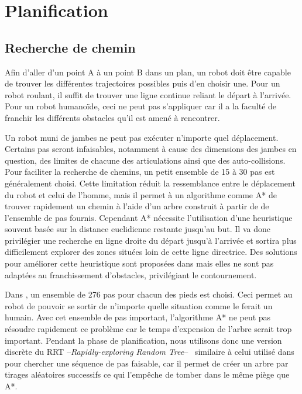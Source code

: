 \section{Planification}
\label{sec:planif}

\subsection{Recherche de chemin}
\label{sub:RRT}


 Afin d'aller d'un point A à un point B dans un plan, un robot doit être capable de trouver les différentes trajectoires possibles puis d'en choisir une.
Pour un robot roulant, il suffit de trouver une ligne continue reliant le départ à l'arrivée. Pour un robot humanoïde, ceci ne peut pas s'appliquer car il a la faculté de franchir les différents obstacles qu'il est amené à rencontrer.

Un robot muni de jambes ne peut pas exécuter n'importe quel déplacement. Certains pas seront infaisables, notamment à cause des dimensions des jambes en question, des limites de chacune des articulations ainsi que des auto-collisions. 
Pour faciliter la recherche de chemins, un petit ensemble de 15 à 30 pas est généralement choisi. Cette limitation réduit la ressemblance entre le déplacement du robot et celui de l'homme, mais il permet à un algorithme comme A* \cite{astar} de trouver rapidement un chemin à l'aide d'un arbre construit à partir de de l'ensemble de pas fournis. Cependant A* nécessite l'utilisation d'une heuristique souvent basée sur la distance euclidienne restante jusqu'au but. Il va donc privilégier une recherche en ligne droite du départ jusqu'à l'arrivée et sortira plus difficilement explorer des zones situées loin de cette ligne directrice. Des solutions pour améliorer cette heuristique sont proposées dans \cite{chestnutt:thesis} mais elles ne sont pas adaptées au franchissement d'obstacles, privilégiant le contournement.

Dans \cite{perrin:TRO:2011}, un ensemble de 276 pas pour chacun des pieds est choisi. Ceci permet au robot de pouvoir se sortir de n'importe quelle situation comme le ferait un humain.
Avec cet ensemble de pas important, l'algorithme A* ne peut pas résoudre rapidement ce problème car le temps d'expension de l'arbre serait trop important. 
 Pendant la phase de planification, nous utilisons donc une version discrète du RRT --\emph{Rapidly-exploring Random Tree}--~\cite{LaValle:WAFR:2000} similaire à celui utilisé dans~\cite{perrin:TRO:2011} pour chercher une séquence de pas faisable, car il permet de créer un arbre par tirages aléatoires successifs ce qui l'empêche de tomber dans le même piège que A*.

